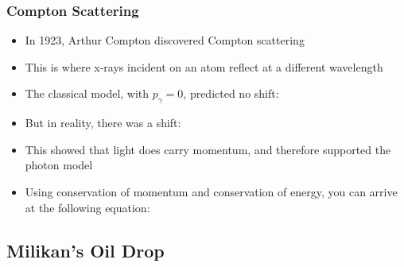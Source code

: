 \documentclass{article}
\begin{document}
\subsubsection*{Compton Scattering}

\begin{itemize}
    \item In 1923, Arthur Compton discovered Compton scattering
    \item This is where x-rays incident on an atom reflect at a different wavelength
    \item The classical model, with \(p_\gamma = 0\), predicted no shift:
    \item But in reality, there was a shift:
    \item This showed that light does carry momentum, and therefore supported the photon model
    \item Using conservation of momentum and conservation of energy, you can arrive at the following equation:
    

\end{itemize}

\subsection{Milikan's Oil Drop}
\end{document}
